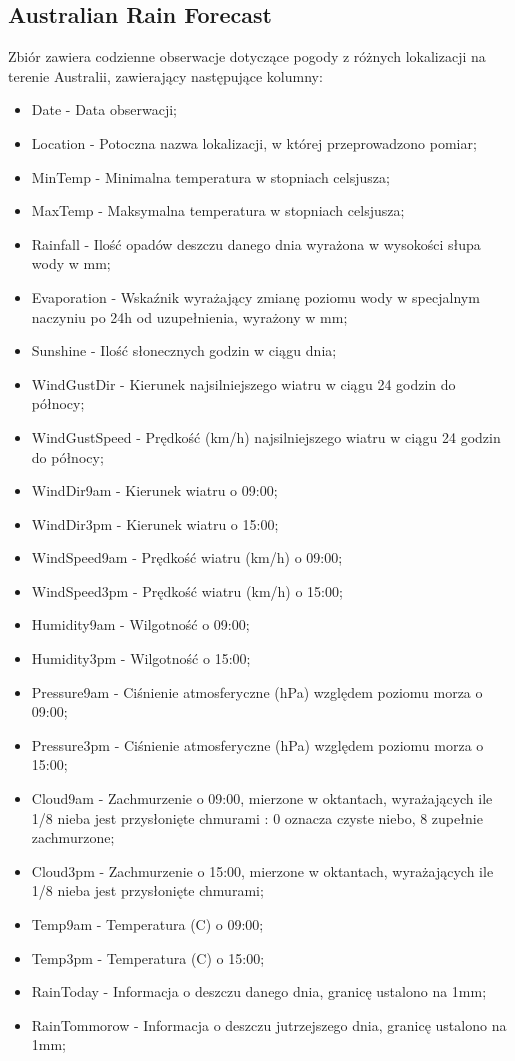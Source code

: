 \documentclass[oneside]{book}
\begin{document}
\subsection{Australian Rain Forecast}
Zbiór zawiera codzienne obserwacje dotyczące pogody z różnych 
lokalizacji na terenie Australii, zawierający następujące kolumny:
\begin{itemize}
    \item Date - Data obserwacji;
    \item Location - Potoczna nazwa lokalizacji, w której przeprowadzono pomiar;
    \item MinTemp - Minimalna temperatura w stopniach celsjusza;
    \item MaxTemp - Maksymalna temperatura w stopniach celsjusza;
    \item Rainfall - Ilość opadów deszczu danego dnia wyrażona w wysokości słupa wody w mm;
    \item Evaporation - Wskaźnik wyrażający zmianę poziomu wody w specjalnym naczyniu po 24h od uzupełnienia, wyrażony w mm;
    \item Sunshine - Ilość słonecznych godzin w ciągu dnia;
    \item WindGustDir - Kierunek najsilniejszego wiatru w ciągu 24 godzin do północy;
    \item WindGustSpeed - Prędkość (km/h) najsilniejszego wiatru w ciągu 24 godzin do północy;
    \item WindDir9am - Kierunek wiatru o 09:00;
    \item WindDir3pm - Kierunek wiatru o 15:00;
    \item WindSpeed9am - Prędkość wiatru (km/h) o 09:00;
    \item WindSpeed3pm - Prędkość wiatru (km/h) o 15:00;
    \item Humidity9am - Wilgotność o 09:00;
    \item Humidity3pm - Wilgotność o 15:00;
    \item Pressure9am - Ciśnienie atmosferyczne (hPa) względem poziomu morza o 09:00;
    \item Pressure3pm - Ciśnienie atmosferyczne (hPa) względem poziomu morza o 15:00;
    \item Cloud9am - Zachmurzenie o 09:00, mierzone w oktantach, wyrażających ile 1/8 nieba jest przysłonięte chmurami : 0 oznacza czyste niebo, 8 zupełnie zachmurzone;
    \item Cloud3pm - Zachmurzenie o 15:00, mierzone w oktantach, wyrażających ile 1/8 nieba jest przysłonięte chmurami;
    \item Temp9am - Temperatura (C) o 09:00;
    \item Temp3pm - Temperatura (C) o 15:00;
    \item RainToday - Informacja o deszczu danego dnia, granicę ustalono na 1mm;
    \item RainTommorow - Informacja o deszczu jutrzejszego dnia, granicę ustalono na 1mm;
    
\end{itemize}
\end{document}
